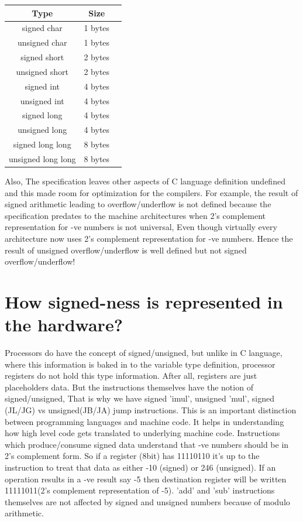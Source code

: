 \documentclass{article}
\begin{document}
\begin{center}
\begin{tabular}{|c|c|c|}
 Type       &Size       \\
 \hline
 signed char         & 1 bytes \\
 unsigned char       & 1 bytes \\
 signed short        & 2 bytes \\
 unsigned short      & 2 bytes \\
 signed int          & 4 bytes \\
 unsigned int        & 4 bytes \\
 signed long         & 4 bytes \\
 unsigned long       & 4 bytes \\
 signed long long    & 8 bytes \\
 unsigned long long  & 8 bytes
\end{tabular}
\end{center}

Also, The specification leaves other aspects of C language definition undefined
and this made room for optimization for the compilers.
For example, the result of signed arithmetic leading to overflow/underflow is
not defined because the specification predates to the machine architectures when
2's complement representation for -ve numbers is not universal, Even though
virtually every architecture now uses 2's complement representation for -ve
numbers. Hence the result of unsigned overflow/underflow is well defined but not
signed overflow/underflow!

\section{How signed-ness is represented in the hardware?}
Processors do have the concept of signed/unsigned, but unlike in C language,
where this information is baked in to the variable type definition, processor
registers do not hold this type information. After all, registers are just
placeholders data. But the instructions themselves have the notion of
signed/unsigned, That is why we have signed 'imul', unsigned 'mul', signed
(JL/JG) vs unsigned(JB/JA) jump instructions. This is an important distinction
between programming languages and machine code. It helps in understanding how
high level code gets translated to underlying machine code. Instructions which
produce/consume signed data understand that -ve numbers should be in 2's
complement form. So if a register (8bit) has 11110110 it's up to the instruction
to treat that data as either -10 (signed) or 246 (unsigned). If an operation
results in a -ve result say -5 then destination register will be written
11111011(2's complement representation of -5). 'add' and 'sub' instructions
themselves are not affected by signed and unsigned numbers because of modulo
arithmetic.
\end{document}
